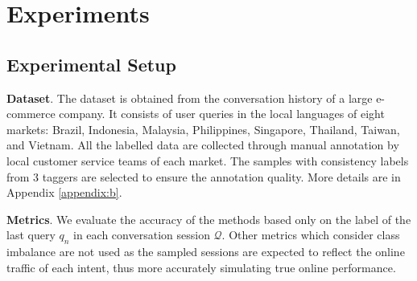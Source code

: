 \section{Experiments}
\subsection{Experimental Setup}
\textbf{Dataset}. The dataset is obtained from the conversation history of a large e-commerce company. It consists of user queries in the local languages of eight markets: Brazil, Indonesia, Malaysia, Philippines, Singapore, Thailand, Taiwan, and Vietnam.  All the labelled data are collected through manual annotation by local customer service teams of each market. The samples with consistency labels from 3 taggers are selected to ensure the annotation quality. More details are in Appendix \ref{appendix:b}.



\noindent\textbf{Metrics}. We evaluate the accuracy of the methods based only on the label of the last query $q_n$ in each conversation session $\mathcal{Q}$. Other metrics which consider class imbalance are not used as the sampled sessions are expected to reflect the online traffic of each intent, thus more accurately simulating true online performance.





